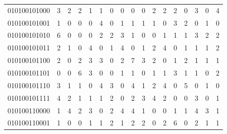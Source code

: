\documentclass[10pt,a4paper]{article}
\begin{document}
\begin{longtable}{ |c|c|c|c|c|c|c|c|c|c|c|c|c|c|c|c|c| }
    010100101000              & 3                            & 2                                & 2                            & 1                              & 1   & 0   & 0   & 0   & 0   & 2   & 2   & 2   & 0   & 3   & 0   & 4   \\
    010100101001              & 1                            & 0                                & 0                            & 0                              & 4   & 0   & 1   & 1   & 1   & 1   & 0   & 3   & 2   & 0   & 1   & 0   \\
    010100101010              & 6                            & 0                                & 0                            & 0                              & 2   & 2   & 3   & 1   & 0   & 0   & 1   & 1   & 1   & 3   & 2   & 2   \\
    010100101011              & 2                            & 1                                & 0                            & 4                              & 0   & 1   & 4   & 0   & 1   & 2   & 4   & 0   & 1   & 1   & 1   & 2   \\
    010100101100              & 2                            & 0                                & 2                            & 3                              & 3   & 0   & 2   & 7   & 3   & 2   & 0   & 1   & 2   & 1   & 1   & 1   \\
    010100101101              & 0                            & 0                                & 6                            & 3                              & 0   & 0   & 1   & 1   & 0   & 1   & 1   & 3   & 1   & 1   & 0   & 2   \\
    010100101110              & 3                            & 1                                & 1                            & 0                              & 4   & 3   & 0   & 4   & 1   & 2   & 4   & 0   & 5   & 0   & 1   & 0   \\
    010100101111              & 4                            & 2                                & 1                            & 1                              & 1   & 2   & 0   & 2   & 3   & 4   & 2   & 0   & 0   & 3   & 0   & 1   \\
    010100110000              & 1                            & 4                                & 2                            & 3                              & 0   & 2   & 4   & 4   & 1   & 0   & 0   & 1   & 1   & 4   & 3   & 1   \\
    010100110001              & 1                            & 0                                & 0                            & 1                              & 1   & 2   & 1   & 2   & 2   & 0   & 2   & 6   & 0   & 2   & 1   & 1   \\

\end{longtable}
\end{document}
